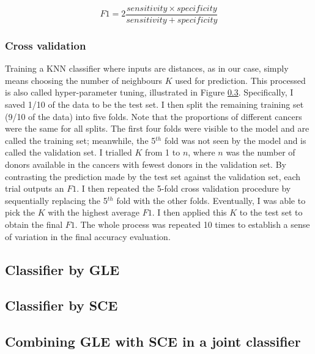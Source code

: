 \begin{equation}
    F1 = 2\frac{sensitivity \times specificity}{sensitivity + specificity}    
    \label{eq:f1}
\end{equation}

\subsubsection{Cross validation}
Training a KNN classifier where inputs are distances, as in our case, simply means choosing the number of neighbours $K$ used for prediction. This processed is also called hyper-parameter tuning, illustrated in Figure \ref{}. Specifically, I saved 1/10 of the data to be the test set. I then split the remaining training set (9/10 of the data) into five folds. Note that the proportions of different cancers were the same for all splits. The first four folds were visible to the model and are called the training set; meanwhile, the 5$^{th}$ fold was not seen by the model and is called the validation set. I trialled $K$ from 1 to $n$, where $n$ was the number of donors available in the cancers with fewest donors in the validation set. By contrasting the prediction made by the test set against the validation set, each trial outputs an $F1$. I then repeated the 5-fold cross validation procedure by sequentially replacing the 5$^{th}$ fold with the other folds. Eventually, I was able to pick the $K$ with the highest average $F1$. I then applied this $K$ to the test set to obtain the final $F1$. The whole process was repeated 10 times to establish a sense of variation in the final accuracy evaluation.



\subsection{Classifier by GLE}
\subsection{Classifier by SCE}
\subsection{Combining GLE with SCE in a joint classifier}

